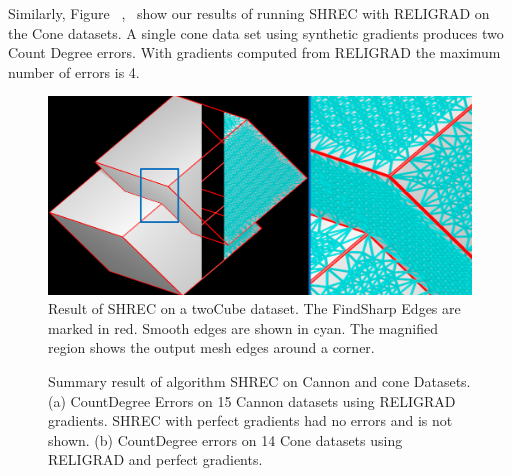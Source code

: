 Similarly, Figure ~\protect{},~\protect{} show our results of running SHREC with RELIGRAD on the Cone datasets.
A single cone data set using synthetic gradients produces two Count Degree errors. With gradients computed from RELIGRAD the maximum number of errors is 4.
\begin{figure}[tb]
	\includegraphics[width=\linewidth]{images/shrecPerfect.eps}
	\caption{Result of SHREC on a twoCube dataset. The FindSharp Edges are marked in red. Smooth edges are shown in cyan. The magnified region shows the output mesh edges around a corner.}
	\label{fig:shrecPerfect1}
\end{figure}
\begin{figure}[tb]
	\caption{Summary result of algorithm SHREC on Cannon and cone Datasets. (a) CountDegree Errors on 15 Cannon datasets using RELIGRAD gradients. SHREC with perfect gradients had no errors and is not shown. (b) CountDegree errors on 14 Cone datasets using RELIGRAD and perfect gradients.}
	\label{fig:cannon_cone_summary}
\end{figure}
